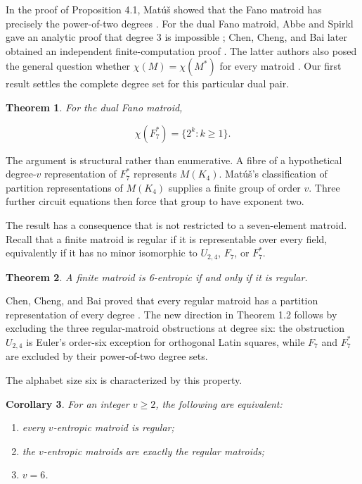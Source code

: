 \documentclass[11pt]{article}
\newtheorem{theorem}{Theorem}[section]
\newtheorem{corollary}[theorem]{Corollary}
\numberwithin{equation}{section}
\begin{document}
In the proof of Proposition 4.1, Mat\'u\v{s} showed that the Fano matroid has
precisely the power-of-two degrees \cite{matus1999}. For the dual Fano matroid, Abbe and
Spirkl gave an analytic proof that degree $3$ is impossible \cite[Lemma 9]{abbe2019};
Chen, Cheng, and Bai later obtained an independent finite-computation proof
\cite[Lemma 4]{chen2025}. The latter authors also posed the general question whether
$\chi(M)=\chi(M^*)$ for every matroid \cite[Conjecture 1]{chen2025}. Our first result
settles the complete degree set for this particular dual pair.

\Needspace{0.26\textheight}
\begin{theorem}
For the dual Fano matroid,

\nopagebreak[4]
\[
\chi(F_7^*)=\{2^k:k\ge 1\}.
\]

\end{theorem}

The argument is structural rather than enumerative. A fibre of a hypothetical
degree-$v$ representation of $F_7^*$ represents $M(K_4)$. Mat\'u\v{s}'s
classification of partition representations of $M(K_4)$ supplies a finite
group of order $v$. Three further circuit equations then force that group
to have exponent two.

The result has a consequence that is not restricted to a seven-element
matroid. Recall that a finite matroid is regular if it is representable over
every field, equivalently if it has no minor isomorphic to
$U_{2,4}$, $F_7$, or $F_7^*$.

\Needspace{0.26\textheight}
\begin{theorem}
A finite matroid is 6-entropic if and only if it is regular.

\end{theorem}

Chen, Cheng, and Bai proved that every regular matroid has a partition
representation of every degree \cite[Proposition 7]{chen2025}. The new direction in
Theorem 1.2 follows by excluding the three regular-matroid obstructions at
degree six: the obstruction $U_{2,4}$ is Euler's order-six exception for
orthogonal Latin squares, while $F_7$ and $F_7^*$ are excluded by their
power-of-two degree sets.

The alphabet size six is characterized by this property.

\Needspace{0.26\textheight}
\begin{corollary}
For an integer $v\ge 2$, the following are equivalent:

\begin{enumerate}
\item every $v$-entropic matroid is regular;
\item the $v$-entropic matroids are exactly the regular matroids;
\item $v=6$.

\end{enumerate}

\end{corollary}
\end{document}
